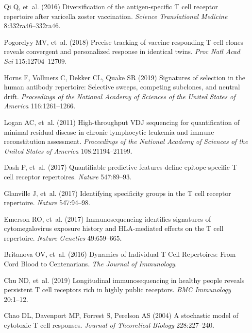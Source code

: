 \documentclass[pre,twocolumn,english,longbibliography]{revtex4}
\newcommand{\<}{\langle}
\renewcommand{\>}{\rangle}
\begin{document}
\begin{thebibliography}{10}
Qi Q, {et~al.}
\newblock (2016) {Diversification of the antigen-specific T cell receptor
  repertoire after varicella zoster vaccination}.
\newblock \emph{Science Translational Medicine} 8:332ra46--332ra46.

Pogorelyy MV, {et~al.}
\newblock (2018) {Precise tracking of vaccine-responding T-cell clones reveals
  convergent and personalized response in identical twins}.
\newblock \emph{Proc Natl Acad Sci} 115:12704--12709.

Horns F, Vollmers C, Dekker CL, Quake SR
\newblock (2019) {Signatures of selection in the human antibody repertoire:
  Selective sweeps, competing subclones, and neutral drift}.
\newblock \emph{Proceedings of the National Academy of Sciences of the United
  States of America} 116:1261--1266.

Logan AC, {et~al.}
\newblock (2011) {High-throughput VDJ sequencing for quantification of minimal
  residual disease in chronic lymphocytic leukemia and immune reconstitution
  assessment}.
\newblock \emph{Proceedings of the National Academy of Sciences of the United
  States of America} 108:21194--21199.

Dash P, {et~al.}
\newblock (2017) {Quantifiable predictive features define epitope-specific T
  cell receptor repertoires}.
\newblock \emph{Nature} 547:89--93.

Glanville J, {et~al.}
\newblock (2017) {Identifying specificity groups in the T cell receptor
  repertoire}.
\newblock \emph{Nature} 547:94--98.

Emerson RO, {et~al.}
\newblock (2017) {Immunosequencing identifies signatures of cytomegalovirus
  exposure history and HLA-mediated effects on the T cell repertoire}.
\newblock \emph{Nature Genetics} 49:659--665.

Britanova OV, {et~al.}
\newblock (2016) {Dynamics of Individual T Cell Repertoires: From Cord Blood to
  Centenarians}.
\newblock \emph{The Journal of Immunology}.

Chu ND, {et~al.}
\newblock (2019) {Longitudinal immunosequencing in healthy people reveals
  persistent T cell receptors rich in highly public receptors}.
\newblock \emph{BMC Immunology} 20:1--12.

Chao DL, Davenport MP, Forrest S, Perelson AS
\newblock (2004) {A stochastic model of cytotoxic T cell responses}.
\newblock \emph{Journal of Theoretical Biology} 228:227--240.


\end{thebibliography}
\end{document}
